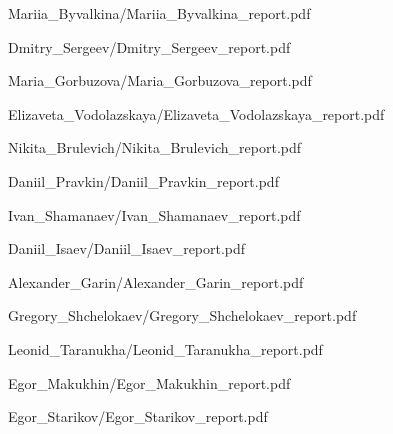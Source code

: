 \documentclass[a4paper]{article}
\begin{document}
{Mariia_Byvalkina/Mariia_Byvalkina_report.pdf}

{Dmitry_Sergeev/Dmitry_Sergeev_report.pdf}

{Maria_Gorbuzova/Maria_Gorbuzova_report.pdf}

{Elizaveta_Vodolazskaya/Elizaveta_Vodolazskaya_report.pdf}

{Nikita_Brulevich/Nikita_Brulevich_report.pdf}

{Daniil_Pravkin/Daniil_Pravkin_report.pdf}

{Ivan_Shamanaev/Ivan_Shamanaev_report.pdf}

{Daniil_Isaev/Daniil_Isaev_report.pdf}

{Alexander_Garin/Alexander_Garin_report.pdf}

{Gregory_Shchelokaev/Gregory_Shchelokaev_report.pdf}

{Leonid_Taranukha/Leonid_Taranukha_report.pdf}

{Egor_Makukhin/Egor_Makukhin_report.pdf}

{Egor_Starikov/Egor_Starikov_report.pdf}
\end{document}

